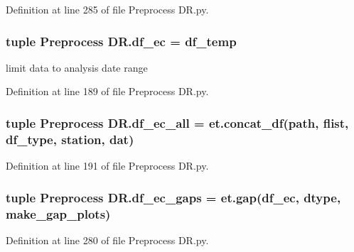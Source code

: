 Definition at line 285 of file Preprocess D\+R.\+py.

\hypertarget{namespace_preprocess_01_d_r_a6afbb82db5a6278359661ab35a56be0b}{}
\subsubsection[{df\+\_\+ec}]{\setlength{\rightskip}{0pt plus 5cm}tuple Preprocess D\+R.\+df\+\_\+ec = {\bf df\+\_\+temp}}\label{namespace_preprocess_01_d_r_a6afbb82db5a6278359661ab35a56be0b}


limit data to analysis date range 



Definition at line 189 of file Preprocess D\+R.\+py.

\hypertarget{namespace_preprocess_01_d_r_a416dccd46e76a20b33904f972fe464df}{}
\subsubsection[{df\+\_\+ec\+\_\+all}]{\setlength{\rightskip}{0pt plus 5cm}tuple Preprocess D\+R.\+df\+\_\+ec\+\_\+all = et.\+concat\+\_\+df({\bf path}, {\bf flist}, {\bf df\+\_\+type}, {\bf station}, \textquotesingle{}dat\textquotesingle{})}\label{namespace_preprocess_01_d_r_a416dccd46e76a20b33904f972fe464df}


Definition at line 191 of file Preprocess D\+R.\+py.

\hypertarget{namespace_preprocess_01_d_r_a6d9628d1772f7649cb01ee5014068f0b}{}
\subsubsection[{df\+\_\+ec\+\_\+gaps}]{\setlength{\rightskip}{0pt plus 5cm}tuple Preprocess D\+R.\+df\+\_\+ec\+\_\+gaps = et.\+gap({\bf df\+\_\+ec}, {\bf dtype}, {\bf make\+\_\+gap\+\_\+plots})}\label{namespace_preprocess_01_d_r_a6d9628d1772f7649cb01ee5014068f0b}


Definition at line 280 of file Preprocess D\+R.\+py.

\hypertarget{namespace_preprocess_01_d_r_a76371d4dc94517f100a4b6c2a44a66e9}{}
